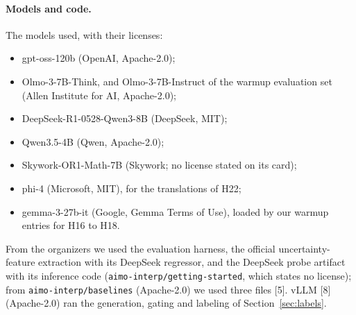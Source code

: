 \paragraph{Models and code.} The models used, with their licenses:
\begin{itemize}
\item gpt-oss-120b (OpenAI, Apache-2.0);
\item Olmo-3-7B-Think, and Olmo-3-7B-Instruct of the warmup evaluation set (Allen Institute for AI, Apache-2.0);
\item DeepSeek-R1-0528-Qwen3-8B (DeepSeek, MIT);
\item Qwen3.5-4B (Qwen, Apache-2.0);
\item Skywork-OR1-Math-7B (Skywork; no license stated on its card);
\item phi-4 (Microsoft, MIT), for the translations of H22;
\item gemma-3-27b-it (Google, Gemma Terms of Use), loaded by our warmup entries for H16 to H18.
\end{itemize}
From the organizers we used the evaluation harness, the official uncertainty-feature extraction with its DeepSeek regressor, and the DeepSeek probe artifact with its inference code (\texttt{aimo-interp/getting-started}, which states no license); from \texttt{aimo-interp/baselines} (Apache-2.0) we used three files [5]. vLLM [8] (Apache-2.0) ran the generation, gating and labeling of Section~\ref{sec:labels}.

